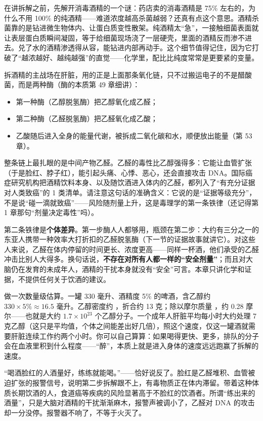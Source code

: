 在讲拆解之前，先解开消毒酒精的一个谜：药店卖的消毒酒精是 75\% 左右的，为什么不用 100\% 的纯酒精——难道浓度越高杀菌越弱？还真有点这个意思。酒精杀菌靠的是钻进微生物体内、让蛋白质变性散架。纯酒精太“急”，一接触细菌表面就让表层蛋白质瞬间凝固，等于给细菌现场浇了一层硬壳，里面的酒精反而渗不进去。兑了水的酒精渗透得从容，能钻进内部再动手。这个细节值得记住，因为它打破了“越浓越好、越纯越强”的直觉——化学里，配比比纯度常常是更要紧的变量。

拆酒精的主战场在肝脏，用的正是上面那条氧化链，只不过搬运电子的不是醋酸菌，而是两种酶（酶的本质第 49 章细讲）：

\begin{itemize}[itemsep=2pt]
\item 第一种酶（乙醇脱氢酶）把乙醇氧化成乙醛；
\item 第二种酶（乙醛脱氢酶）把乙醛氧化成乙酸；
\item 乙酸随后进入全身的能量代谢，被拆成二氧化碳和水，顺便放出能量（第 53 章）。
\end{itemize}

整条链上最扎眼的是中间产物乙醛。乙醛的毒性比乙醇强得多：它能让血管扩张（于是脸红、脖子红），能引起头痛、心悸、恶心，还会直接攻击 DNA。国际癌症研究机构把酒精饮料本身、以及随饮酒进入体内的乙醛，都列入了“有充分证据对人类致癌”的 1 类清单。请注意这句话的准确含义：它说的是“证据等级充分”，不是说“碰一滴就致癌”——风险随剂量上升，这是毒理学的第一条铁律（还记得第 1 章那句“剂量决定毒性”吗）。

第二条铁律是\textbf{个体差异}。第一步酶人人都够用，瓶颈在第二步：大约有三分之一的东亚人携带一种效率大打折扣的乙醛脱氢酶（下一节的证据故事就讲它）。对这些人来说，乙醛在体内停留的时间更长、浓度更高——同样一杯酒，他们承受的乙醛冲击比别人大得多。换句话说，\textbf{不存在对所有人都一样的“安全剂量”}；而且对大脑仍在发育的未成年人，酒精的干扰本身就没有“安全”可言。本章只讲化学和证据，不提供任何关于饮酒的建议。

\begin{qiaoliang}
做一次数量级估算。一罐 330 毫升、酒精度 5\% 的啤酒，含乙醇约 $330\times 5\% \approx 16.5$ 毫升。乙醇密度约 ，折合约 13 克；除以摩尔质量 ，约 0.28 摩尔——也就是大约 $1.7\times 10^{23}$ 个乙醇分子。一个成年人肝脏平均每小时大约处理 7 克乙醇（这只是平均值，个体之间能差出好几倍），照这个速度，仅这一罐酒就需要肝脏连续工作约两个小时。你可以自己算算：如果喝得更快、更多，排队的分子会在血液里积到什么程度——“醉”，本质上就是进入身体的速度远远跑赢了拆解的速度。
\end{qiaoliang}

\begin{wuqu}
“喝酒脸红的人酒量好，练练就能喝。”——恰好说反了。脸红是乙醛堆积、血管被迫扩张的报警信号，说明第二步拆解跟不上，有毒物质正在体内滞留。带着这种体质长期饮酒的人，食道癌等疾病的风险显著高于不脸红的饮酒者。所谓“练出来的酒量”，只是大脑对酒精的干扰渐渐麻木，报警声被调小了，乙醛对 DNA 的攻击却一分没停。报警器不响了，不等于火灭了。
\end{wuqu}

